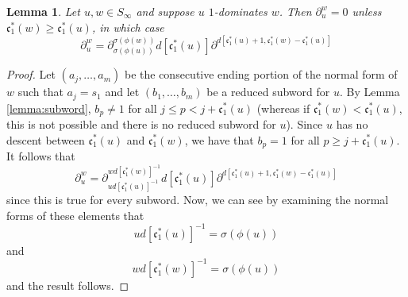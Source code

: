 \documentclass{amsart}
\newtheorem{lemma}{Lemma}[subsection]
\newtheorem{proposition}[lemma]{Proposition}
\theoremstyle{definition}
\theoremstyle{remark}
\numberwithin{equation}{subsection}
\newcommand{\code}{\mathfrak{c}}
\begin{document}

\begin{lemma} \label{lemma:divform}
Let $u, w\in S_\infty$ and suppose $u$ $1$-dominates $w$. Then $\partial_u^w=0$ unless $\code_1^*(w)\geq\code_1^*(u)$, in which case
$$\partial_u^w=\partial_{\sigma(\phi(u))}^{\sigma(\phi(w))}d[\code_1^*(u)]\partial^{d[\code_1^*(u)+1,\code_1^*(w)-\code_1^*(u)]}$$
\end{lemma}
\begin{proof}
Let $(a_j,\ldots,a_m)$ be the consecutive ending portion of the normal form of $w$ such that $a_j=s_1$ and let $(b_1,\ldots,b_m)$ be a reduced subword for $u$. By Lemma \ref{lemma:subword}, $b_p\neq 1$ for all $j\leq p<j+\code_1^*(u)$ (whereas if $\code_1^*(w)<\code_1^*(u)$, this is not possible and there is no reduced subword for $u$). Since $u$ has no descent between $\code_1^*(u)$ and $\code_1^*(w)$, we have that $b_p=1$ for all $p\geq j+\code_1^*(u)$. It follows that
$$\partial_u^w=\partial_{ud[\code_1^*(u)]^{-1}}^{wd[\code_1^*(w)]^{-1}}d[\code_1^*(u)]\partial^{d[\code_1^*(u)+1,\code_1^*(w)-\code_1^*(u)]}$$
since this is true for every subword. Now, we can see by examining the normal forms of these elements that
$$ud[\code_1^*(u)]^{-1}=\sigma(\phi(u))$$
and
$$wd[\code_1^*(w)]^{-1}=\sigma(\phi(u))$$
and the result follows.
\end{proof}
\end{document}
